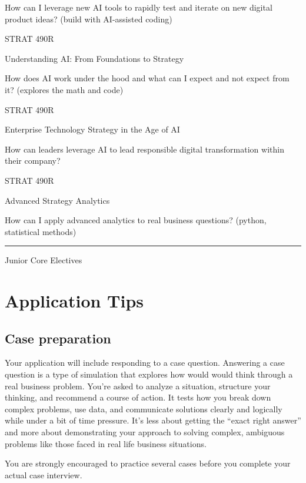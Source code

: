 \documentclass[
  letterpaper,
  DIV=11,
  numbers=noendperiod]{scrreprt}
\begin{document}
How can I leverage new AI tools to rapidly test and iterate on new
digital product ideas? (build with AI-assisted coding)

STRAT 490R

Understanding AI: From Foundations to Strategy

How does AI work under the hood and what can I expect and not expect
from it? (explores the math and code)

STRAT 490R

Enterprise Technology Strategy in the Age of AI

How can leaders leverage AI to lead responsible digital transformation
within their company?

STRAT 490R

Advanced Strategy Analytics

How can I apply advanced analytics to real business questions? (python,
statistical methods)

\begin{center}\rule{0.5\linewidth}{0.5pt}\end{center}

{} Junior Core {} Electives

\section*{Application Tips}\label{application-tips}


\subsection*{Case preparation}\label{case-preparation}

Your application will include responding to a case question. Answering a
case question is a type of simulation that explores how would would
think through a real business problem. You're asked to analyze a
situation, structure your thinking, and recommend a course of action. It
tests how you break down complex problems, use data, and communicate
solutions clearly and logically while under a bit of time pressure. It's
less about getting the ``exact right answer'' and more about
demonstrating your approach to solving complex, ambiguous problems like
those faced in real life business situations.

You are strongly encouraged to practice several cases before you
complete your actual case interview.
\end{document}
